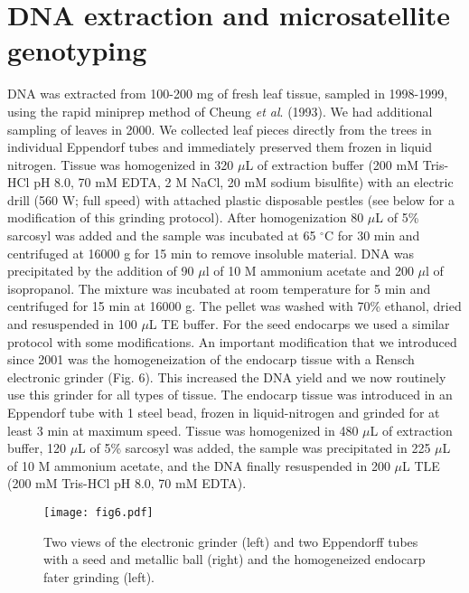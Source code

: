 \documentclass[a4paper,12pt]{article}
\newcommand{\tab}{\hspace{5mm}}
\begin{document}
\section{DNA extraction and microsatellite genotyping}

\tab DNA was extracted from 100-200 mg of fresh leaf tissue, sampled in 1998-1999, using the rapid miniprep method of Cheung \textit{et al}. (1993). We had additional sampling of leaves in 2000. We collected leaf pieces directly from the trees in individual Eppendorf tubes and immediately preserved them frozen in liquid nitrogen. Tissue was homogenized in 320 \ensuremath{\mu}L of extraction buffer (200 mM Tris-HCl pH 8.0, 70 mM EDTA, 2 M NaCl, 20 mM sodium bisulfite) with an electric drill (560 W; full speed) with attached plastic disposable pestles (see below for a modification of this grinding protocol). After homogenization 80 \ensuremath{\mu}L of 5\% sarcosyl was added and the sample was incubated at 65 \ensuremath{^\circ}C for 30 min and centrifuged at 16000 g for 15 min to remove insoluble material. DNA was precipitated by the addition of 90 \ensuremath{\mu}l of 10 M ammonium acetate and 200 \ensuremath{\mu}l of isopropanol. The mixture was incubated at room temperature for 5 min and centrifuged for 15 min at 16000 g. The pellet was washed with 70\% ethanol, dried and resuspended in 100 \ensuremath{\mu}L TE buffer. For the seed endocarps we used a similar protocol with some modifications. An important modification that we introduced since 2001 was the homogeneization of the endocarp tissue with a Rensch electronic grinder (Fig. 6). This increased the DNA yield and we now routinely use this grinder for all types of tissue. The endocarp tissue was introduced in an Eppendorf tube with 1 steel bead, frozen in liquid-nitrogen and grinded for at least 3 min at maximum speed. Tissue was homogenized in 480 \ensuremath{\mu}L of extraction buffer, 120 \ensuremath{\mu}L of 5\% sarcosyl was added, the sample was precipitated in 225 \ensuremath{\mu}L of 10 M ammonium acetate, and the DNA finally resuspended in 200 \ensuremath{\mu}L TLE (200 mM Tris-HCl pH 8.0, 70 mM EDTA).

\begin{figure}[htbp]
\centerline{\texttt{[image: fig6.pdf]}}
%
\caption{Two views of the electronic grinder (left) and two Eppendorff tubes with a seed and metallic ball (right) and the homogeneized endocarp fater grinding (left).}
\end{figure}%
\end{document}
